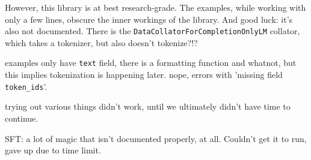 {
\color{blue}
However, this library is at best research-grade. The examples, while working with only a few lines, obscure the inner workings of the library.
And good luck: it's also not documented. There is the \verb`DataCollatorForCompletionOnlyLM` collator, which takes a tokenizer, but also doesn't tokenize?!?

examples only have \verb`text` field, there is a formatting function and whatnot, but this implies tokenization is happening later. nope, errors with 'missing field \verb`token_ids`'.

trying out various things didn't work, until we ultimately didn't have time to continue.

SFT: a lot of magic that isn't documented properly, at all. Couldn't get it to run, gave up due to time limit.
}



